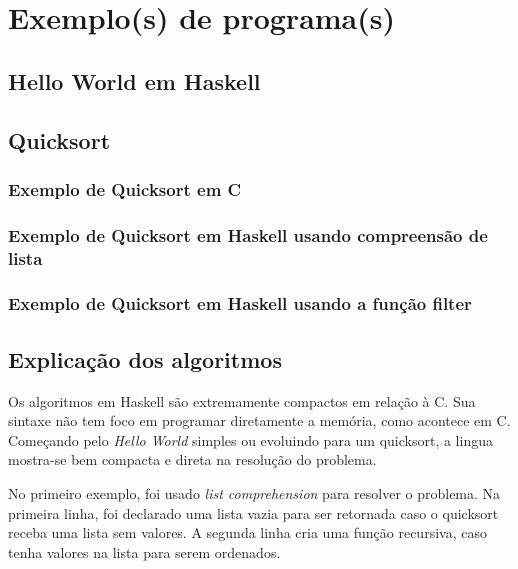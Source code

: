 \chapter{Exemplo(s) de programa(s)}

\setcounter{section}{0}

\section{Hello World em Haskell}


\section{Quicksort}
\subsection{Exemplo de Quicksort em C}


\subsection{Exemplo de Quicksort em Haskell usando compreensão de lista} 

      

\newpage

\subsection{Exemplo de Quicksort em Haskell usando a função filter}



\section{Explicação dos algoritmos}
Os algoritmos em Haskell são extremamente compactos em relação à C. Sua sintaxe não tem foco
em programar diretamente a memória, como acontece em C. Começando pelo \emph{Hello World} simples ou evoluindo
para um quicksort, a lingua mostra-se bem compacta e direta na resolução do problema.

No primeiro exemplo, foi usado \emph{list comprehension} para resolver o problema. Na primeira linha,
foi declarado uma lista vazia para ser retornada caso o quicksort receba uma lista sem valores. A segunda linha
cria uma função recursiva, caso tenha valores na lista para serem ordenados.

